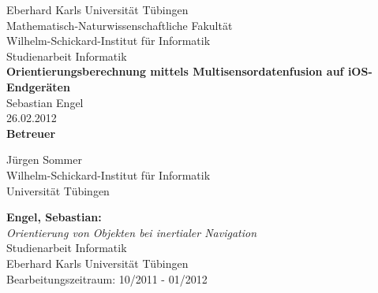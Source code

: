\documentclass[twoside,12pt,a4paper]{report}
\begin{document}
 
\begin{titlepage}
	\begin{center}
  		{\LARGE Eberhard Karls Universität Tübingen}\\
		{\large Mathematisch-Naturwissenschaftliche Fakultät \\
		Wilhelm-Schickard-Institut für Informatik\\[4cm]}
  		{\huge Studienarbeit Informatik\\[2cm]}
  		{\Large\bf  Orientierungsberechnung mittels Multisensordatenfusion auf iOS-Endgeräten\\[1.5cm]}
 		{\large Sebastian Engel}\\[0.5cm]
		26.02.2012 \\[4cm]
		{\small\bf Betreuer}\\[0.5cm]
  		\parbox{7cm}{
  			\begin{center}
				{\large Jürgen Sommer}\\
	  			{\footnotesize Wilhelm-Schickard-Institut für Informatik\\
				Universität Tübingen}
			\end{center}
 		}
 	\end{center}
\end{titlepage}


\thispagestyle{empty}
\vspace*{\fill}
\begin{minipage}{11.2cm}
\textbf{Engel, Sebastian:}\\
\emph{Orientierung von Objekten bei inertialer Navigation}\\ Studienarbeit Informatik\\
Eberhard Karls Universität Tübingen\\
Bearbeitungszeitraum: 10/2011 - 01/2012
\end{minipage}
\newpage


\setcounter{page}{1}

\end{document}
